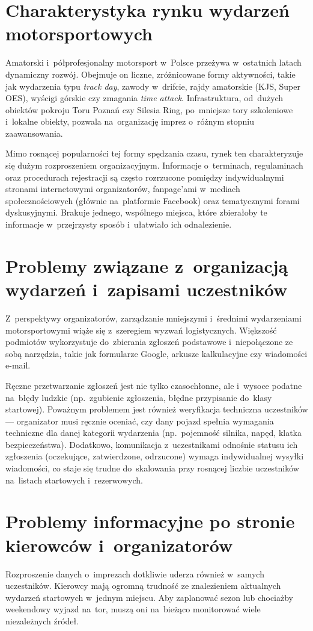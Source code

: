 \documentclass{sprz}
\begin{document}
\section{Charakterystyka rynku wydarzeń motorsportowych}
Amatorski i~półprofesjonalny motorsport w~Polsce przeżywa w~ostatnich latach dynamiczny rozwój. Obejmuje on liczne, zróżnicowane formy aktywności, takie jak wydarzenia typu \emph{track day}, zawody w~drifcie, rajdy amatorskie (KJS, Super OES), wyścigi górskie czy zmagania \emph{time attack}. Infrastruktura, od~dużych obiektów pokroju Toru Poznań czy Silesia Ring, po~mniejsze tory szkoleniowe i~lokalne obiekty, pozwala na~organizację imprez o~różnym stopniu zaawansowania.

Mimo rosnącej popularności tej formy spędzania czasu, rynek ten charakteryzuje się dużym rozproszeniem organizacyjnym. Informacje o~terminach, regulaminach oraz procedurach rejestracji są często rozrzucone pomiędzy indywidualnymi stronami internetowymi organizatorów, fanpage'ami w~mediach społecznościowych (głównie na~platformie Facebook) oraz tematycznymi forami dyskusyjnymi. Brakuje jednego, wspólnego miejsca, które zbierałoby te informacje w~przejrzysty sposób i~ułatwiało ich odnalezienie.

\section{Problemy związane z~organizacją wydarzeń i~zapisami uczestników}
Z~perspektywy organizatorów, zarządzanie mniejszymi i~średnimi wydarzeniami motorsportowymi wiąże się z~szeregiem wyzwań logistycznych. Większość podmiotów wykorzystuje do~zbierania zgłoszeń podstawowe i~niepołączone ze sobą narzędzia, takie jak formularze Google, arkusze kalkulacyjne czy wiadomości e-mail.

Ręczne przetwarzanie zgłoszeń jest nie tylko czasochłonne, ale i~wysoce podatne na~błędy ludzkie (np.\ zgubienie zgłoszenia, błędne przypisanie do~klasy startowej). Poważnym problemem jest również weryfikacja techniczna uczestników --- organizator musi ręcznie oceniać, czy dany pojazd spełnia wymagania techniczne dla danej kategorii wydarzenia (np.\ pojemność silnika, napęd, klatka bezpieczeństwa). Dodatkowo, komunikacja z~uczestnikami odnośnie statusu ich zgłoszenia (oczekujące, zatwierdzone, odrzucone) wymaga indywidualnej wysyłki wiadomości, co staje się trudne do~skalowania przy rosnącej liczbie uczestników na~listach startowych i~rezerwowych.

\section{Problemy informacyjne po stronie kierowców i~organizatorów}
Rozproszenie danych o~imprezach dotkliwie uderza również w~samych uczestników. Kierowcy mają ogromną trudność ze znalezieniem aktualnych wydarzeń startowych w~jednym miejscu. Aby zaplanować sezon lub chociażby weekendowy wyjazd na~tor, muszą oni na~bieżąco monitorować wiele niezależnych źródeł.
\end{document}
